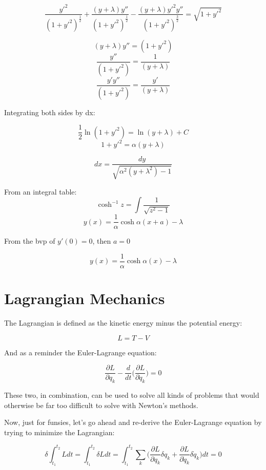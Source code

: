 \documentclass{article}
\begin{document}
$$\frac{ y'^2 }{ ( 1 + y'^2 )^\frac{ 1 }{ 2 } } + \frac{ ( y + \lambda )y'' }{ ( 1 + y'^2 )^\frac{ 1 }{ 2 } } - \frac{ ( y + \lambda )y'^2 y'' }{ ( 1 + y'^2 )^\frac{ 3 }{ 2 } } = \sqrt{ 1 + y'^2 }$$

$$( y + \lambda )y'' = ( 1 + y'^2 )$$
$$\frac{ y'' }{ ( 1 + y'^2 ) } = \frac{ 1 }{ ( y + \lambda ) }$$
$$\frac{ y'y'' }{ ( 1 + y'^2 ) } = \frac{ y' }{ ( y + \lambda ) }$$

Integrating both sides by dx:

$$\frac{ 1 }{ 2 }\ln( 1 + y'^2 ) = \ln( y + \lambda ) + C$$
$$1 + y'^2 = \alpha( y + \lambda )$$

$$dx = \frac{ dy }{ \sqrt{ \alpha^2 ( y + \lambda^2 ) - 1 } }$$

From an integral table:
$$\cosh^{-1}z = \int \frac{ 1 }{ \sqrt{ z^2 - 1 } }$$
$$y( x ) = \frac{ 1 }{ \alpha }\cosh \alpha( x + a ) - \lambda$$

From the bvp of $y'( 0 ) = 0$, then $a = 0$

$$y( x ) = \frac{ 1 }{ \alpha }\cosh \alpha( x ) - \lambda$$





 

%
%
\newpage
\section{Lagrangian Mechanics}

The Lagrangian is defined as the kinetic energy minus the potential energy:

\begin{equation}
L = T - V
\end{equation}

And as a reminder the Euler-Lagrange equation:

\begin{equation}
\frac{ \partial L }{ \partial q_k } - \frac{ d }{ dt } \Big( \frac{ \partial L }{ \partial \dot{ q }_k } \Big) = 0
\end{equation}

These two, in combination, can be used to solve all kinds of problems that would otherwise be far too difficult to solve with Newton's methods.

Now, just for funsies, let's go ahead and re-derive the Euler-Lagrange equation by trying to minimize the Lagrangian:

$$\delta \int_{t_1}^{t_2} L dt = \int_{t_1}^{t_2} \delta L dt = \int_{t_1}^{t_2} \sum_k \Big( \frac{ \partial L }{ \partial q_k } \delta q_k + \frac{ \partial L }{ \partial \dot{ q }_k } \delta \dot{ q }_k \Big) dt = 0$$
\end{document}
